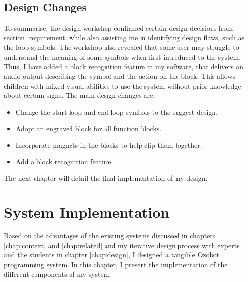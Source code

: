 \documentclass[oneside,%
                    author={Malak Hajji},
                    degree={BSc},
                    title={Designing An Accessible Ozobot Programming Platform for Students},
                  subtitle={With Mixed Visual Abilities}]{dissertation}
\begin{document}
\section{Design Changes}
To summarise, the design workshop confirmed certain design decisions from section \ref{requirement} while also assisting me in identifying design flaws, such as the loop symbols. The workshop also revealed that some user may struggle to understand the meaning of some symbols when first introduced to the system. Thus, I have added a block recognition feature in my software, that delivers an audio output describing the symbol and the action on the block. This allows children with mixed visual abilities to use the system without prior knowledge about certain signs. The main design changes are:
\begin{itemize}
    \item Change the start-loop and end-loop symbols to the suggest design.
    \item Adopt an engraved block for all function blocks.
    \item Incorporate magnets in the blocks to help clip them together.
    \item Add a block recognition feature.
\end{itemize}

The next chapter will detail the final implementation of my design.





\chapter{System Implementation}
\label{chap:implementation}

Based on the advantages of the existing systems discussed in chapters \ref{chap:context} and \ref{chap:related} and my iterative design process with experts and the students in chapter \ref{chap:design}, I designed a tangible Ozobot programming system. In this chapter, I present the implementation of the different components of my system.
\end{document}
